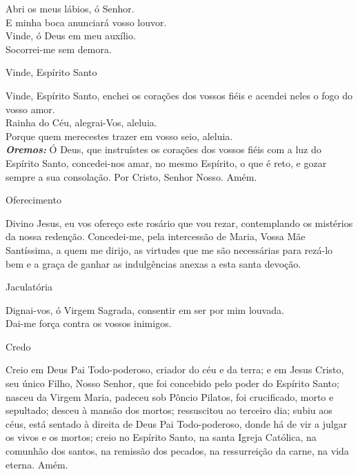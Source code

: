 \documentclass{book}
\begin{document}
\begin{flushleft}
    \VbarRed{} Abri os meus lábios, ó Senhor. \\
    \RbarRed{} E minha boca anunciará vosso louvor. \\
    \hfill{} \break{}
    \VbarRed{} Vinde, ó Deus em meu auxílio. \\
    \RbarRed{} Socorrei-me sem demora.
\end{flushleft}
\begin{center}
    Vinde, Espírito Santo
\end{center}
\begin{flushleft}
    Vinde, Espírito Santo, enchei os corações dos vossos fiéis e acendei neles o fogo do vosso amor. \\
    \VbarRed{} Rainha do Céu, alegrai-Vos, aleluia. \\
    \RbarRed{} Porque quem merecestes trazer em vosso seio, aleluia. \\
    \hfill{} \break{}
    \textbf{\textit{Oremos:}} Ó Deus, que instruístes os corações dos vossos fiéis com a luz do Espírito Santo, concedei-nos amar, no mesmo Espírito, o que é reto, e gozar sempre a sua consolação. Por Cristo, Senhor Nosso. Amém. \\
\end{flushleft}
\begin{center}
    Oferecimento
\end{center}
\begin{flushleft}
    Divino Jesus, eu vos ofereço este rosário que vou rezar, contemplando os mistérios da nossa redenção. Concedei-me, pela intercessão de Maria, Vossa Mãe Santíssima, a quem me dirijo, as virtudes que me são necessárias para rezá-lo bem e a graça de ganhar as indulgências anexas a esta santa devoção.
\end{flushleft}
\begin{center}
    Jaculatória
\end{center}
\begin{flushleft}
    \VbarRed{} Dignai-vos, ó Virgem Sagrada, consentir em ser por mim louvada. \\
    \RbarRed{} Dai-me força contra os vossos inimigos.
\end{flushleft}
\begin{center}
    Credo
\end{center}
\begin{flushleft}
    Creio em Deus Pai Todo-poderoso, criador do céu e da terra; e em Jesus Cristo, seu único Filho, Nosso Senhor, que foi concebido pelo poder do Espírito Santo; nasceu da Virgem Maria, padeceu sob Pôncio Pilatos, foi crucificado, morto e sepultado; desceu à mansão dos mortos; ressuscitou ao terceiro dia; subiu aos céus, está sentado à direita de Deus Pai Todo-poderoso, donde há de vir a julgar os vivos e os mortos; creio no Espírito Santo, na santa Igreja Católica, na comunhão dos santos, na remissão dos pecados, na ressurreição da carne, na vida eterna. Amém.
\end{flushleft}
\end{document}
